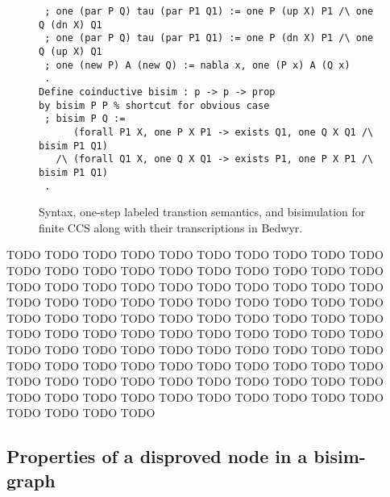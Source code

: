 \documentclass{llncs}
\begin{document}
\begin{figure}
\begin{lstlisting}
 ; one (par P Q) tau (par P1 Q1) := one P (up X) P1 /\ one Q (dn X) Q1
 ; one (par P Q) tau (par P1 Q1) := one P (dn X) P1 /\ one Q (up X) Q1
 ; one (new P) A (new Q) := nabla x, one (P x) A (Q x)
 .
Define coinductive bisim : p -> p -> prop
by bisim P P % shortcut for obvious case
 ; bisim P Q :=
      (forall P1 X, one P X P1 -> exists Q1, one Q X Q1 /\ bisim P1 Q1)
   /\ (forall Q1 X, one Q X Q1 -> exists P1, one P X P1 /\ bisim P1 Q1)
 .
\end{lstlisting}
\vspace*{-2ex}
\caption{Syntax, one-step labeled transtion semantics, and bisimulation
  for finite CCS along with their transcriptions in Bedwyr.}
\label{fig:ccsdef}
\end{figure}

TODO TODO TODO TODO TODO TODO TODO TODO TODO TODO TODO TODO TODO
TODO TODO TODO TODO TODO TODO TODO TODO TODO TODO TODO TODO TODO
TODO TODO TODO TODO TODO TODO TODO TODO TODO TODO TODO TODO TODO
TODO TODO TODO TODO TODO TODO TODO TODO TODO TODO TODO TODO TODO
TODO TODO TODO TODO TODO TODO TODO TODO TODO TODO TODO TODO TODO
TODO TODO TODO TODO TODO TODO TODO TODO TODO TODO TODO TODO TODO
TODO TODO TODO TODO TODO TODO TODO TODO TODO TODO TODO TODO TODO
TODO TODO TODO TODO TODO TODO TODO TODO TODO TODO TODO TODO TODO

\subsection{Properties of a disproved node in a bisim-graph}
\end{document}
